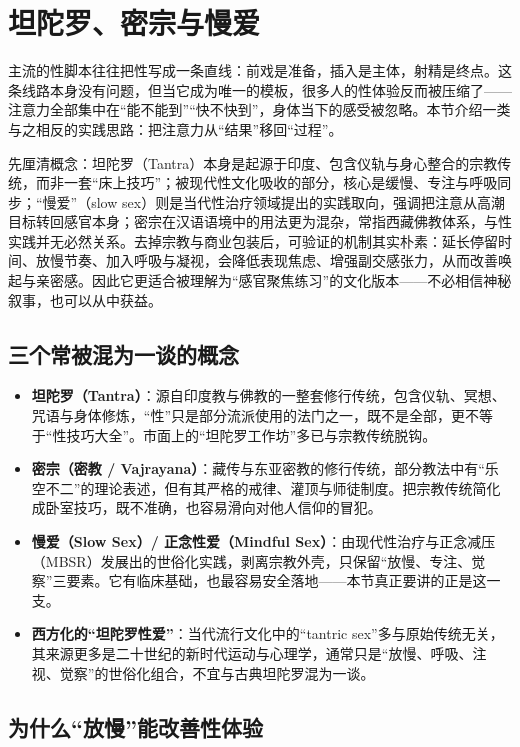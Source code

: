 \documentclass[12pt,UTF8]{ctexbook}
\begin{document}
\section{坦陀罗、密宗与慢爱}

主流的性脚本往往把性写成一条直线：前戏是准备，插入是主体，射精是终点。这条线路本身没有问题，但当它成为唯一的模板，很多人的性体验反而被压缩了——注意力全部集中在“能不能到”“快不快到”，身体当下的感受被忽略。本节介绍一类与之相反的实践思路：把注意力从“结果”移回“过程”。

先厘清概念：坦陀罗（Tantra）本身是起源于印度、包含仪轨与身心整合的宗教传统，而非一套“床上技巧”；被现代性文化吸收的部分，核心是缓慢、专注与呼吸同步；“慢爱”（slow sex）则是当代性治疗领域提出的实践取向，强调把注意从高潮目标转回感官本身；密宗在汉语语境中的用法更为混杂，常指西藏佛教体系，与性实践并无必然关系。去掉宗教与商业包装后，可验证的机制其实朴素：延长停留时间、放慢节奏、加入呼吸与凝视，会降低表现焦虑、增强副交感张力，从而改善唤起与亲密感。因此它更适合被理解为“感官聚焦练习”的文化版本——不必相信神秘叙事，也可以从中获益。

\subsection{三个常被混为一谈的概念}

\begin{itemize}
\item \textbf{坦陀罗（Tantra）}：源自印度教与佛教的一整套修行传统，包含仪轨、冥想、咒语与身体修炼，“性”只是部分流派使用的法门之一，既不是全部，更不等于“性技巧大全”。市面上的“坦陀罗工作坊”多已与宗教传统脱钩。
\item \textbf{密宗（密教 / Vajrayana）}：藏传与东亚密教的修行传统，部分教法中有“乐空不二”的理论表述，但有其严格的戒律、灌顶与师徒制度。把宗教传统简化成卧室技巧，既不准确，也容易滑向对他人信仰的冒犯。
\item \textbf{慢爱（Slow Sex）/ 正念性爱（Mindful Sex）}：由现代性治疗与正念减压（MBSR）发展出的世俗化实践，剥离宗教外壳，只保留“放慢、专注、觉察”三要素。它有临床基础，也最容易安全落地——本节真正要讲的正是这一支。
\item \textbf{西方化的“坦陀罗性爱”}：当代流行文化中的“tantric sex”多与原始传统无关，其来源更多是二十世纪的新时代运动与心理学，通常只是“放慢、呼吸、注视、觉察”的世俗化组合，不宜与古典坦陀罗混为一谈。
\end{itemize}

\subsection{为什么“放慢”能改善性体验}
\end{document}

